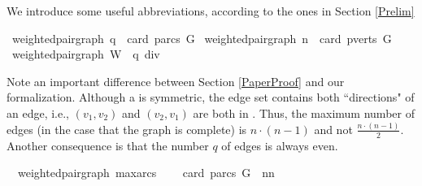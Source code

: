 \begin{isabellebody}
\begin{isamarkuptext}%
We introduce some useful abbreviations, according to the ones in Section \ref{Prelim}%
\end{isamarkuptext}\isamarkuptrue%
\isamarkupfalse%
{\isacharparenleft}\ weighted{\isacharunderscore}pair{\isacharunderscore}graph{\isacharparenright}\ {\isachardoublequoteopen}q\ {\isasymequiv}\ card\ {\isacharparenleft}parcs\ G{\isacharparenright}{\isachardoublequoteclose}\isanewline
{}\isamarkupfalse%
{\isacharparenleft}\ weighted{\isacharunderscore}pair{\isacharunderscore}graph{\isacharparenright}\ {\isachardoublequoteopen}n\ {\isasymequiv}\ card\ {\isacharparenleft}pverts\ G{\isacharparenright}{\isachardoublequoteclose}\isanewline
{}\isamarkupfalse%
{\isacharparenleft}\ weighted{\isacharunderscore}pair{\isacharunderscore}graph{\isacharparenright}\ {\isachardoublequoteopen}W\ {\isasymequiv}\ {\isacharbraceleft}{}{\isachardot}{\isachardot}q\ div\ {}{\isacharbraceright}{\isachardoublequoteclose}%
\begin{isamarkuptext}%
Note an important difference between Section \ref{PaperProof} and our formalization. Although 
a  is symmetric, the edge set contains both ``directions" of an edge, 
i.e., $(v_1,v_2)$ and $(v_2,v_1)$ are both in . Thus, the maximum number of edges (in the 
case that the graph is complete) is $n\cdot(n-1)$ and not $\frac{n\cdot(n-1)}{2}$. Another consequence is that
the number $q$ of edges is always even.%
\end{isamarkuptext}\isamarkuptrue%
\isamarkupfalse%
\ {\isacharparenleft}\ weighted{\isacharunderscore}pair{\isacharunderscore}graph{\isacharparenright}\ max{\isacharunderscore}arcs{\isacharcolon}\ \isanewline
\ \ \ {\isachardoublequoteopen}card\ {\isacharparenleft}parcs\ G{\isacharparenright}\ {\isasymle}\ n{\isacharasterisk}{\isacharparenleft}n{\isacharminus}{}{\isacharparenright}{\isachardoublequoteclose}%
\isadelimproof
%
\endisadelimproof
%
\isatagproof
%
\endisatagproof
{\isafoldproof}%
%
\isadelimproof
%
\endisadelimproof
%
\isadelimproof
%
\endisadelimproof
%
\isatagproof
%
\endisatagproof
{\isafoldproof}%
%
\isadelimproof
%
\endisadelimproof
%
\isadelimproof
%
\endisadelimproof
%
\isatagproof
%
\endisatagproof
{\isafoldproof}%
%
\isadelimproof
%
\endisadelimproof
%
\isadelimproof
%
\endisadelimproof

\end{isabellebody}
